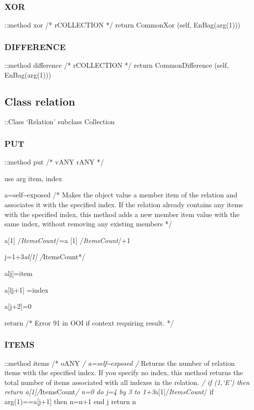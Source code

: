 \hypertarget{xor-1}{%
\subsubsection{XOR}\label{xor-1}}

::method xor /* rCOLLECTION */ return CommonXor (self, EnBag(arg(1)))

\hypertarget{difference-1}{%
\subsubsection{DIFFERENCE}\label{difference-1}}

::method difference /* rCOLLECTION */ return CommonDifference (self,
EnBag(arg(1)))

\hypertarget{class-relation}{%
\subsection{Class relation}\label{class-relation}}

::Class `Relation' subclass Collection

\hypertarget{put-3}{%
\subsubsection{PUT}\label{put-3}}

::method put /* vANY rANY */

use arg item, index

a=self\textasciitilde exposed /* Makes the object value a member item of
the relation and associates it with the specified index. If the relation
already contains any items with the specified index, this method adds a
new member item value with the same index, without removing any existing
members */

a{[}1{]} /\emph{ItemsCount}/=a {[}1{]} /\emph{ItemsCount}/+1

j=1+3\emph{al{[}1{]} /}ItemsCount*/

alj{]}=item

a{[}lj+1{]} =index

a{[}j+2{]}=0

return /* Error 91 in OOI if context requiring result. */

\hypertarget{items-1}{%
\subsubsection{ITEMS}\label{items-1}}

::method items /* oANY \emph{/ a=self\textasciitilde exposed /} Returns
the number of relation items with the specified index. If you specify no
index, this method returns the total number of items associated with all
indexes in the relation. \emph{/ if \arg(1,`E') then return
a{[}1{]}/}ItemsCount\emph{/ n=0 do j=4 by 3 to
1+3}a{[}1{]}/\emph{ItemsCount}/ if arg(1)==a{[}j+1{]} then n=n+1 end j
return n

